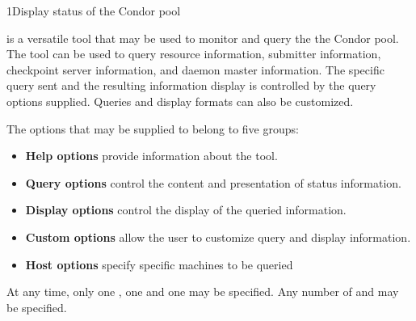\begin{ManPage}{}{1}{Display status of the Condor pool}
\label{man-condor-status}
\Synopsis {}

\Description
{} is a versatile tool that may be used to monitor and query the 
the Condor pool.  The  tool can be used to query resource 
information, submitter information, checkpoint server information, and daemon
master information.  The specific query sent and the resulting information 
display is controlled by the query options supplied.  Queries and display 
formats can also be customized.

The options that may be supplied to  belong to five groups:
\begin{itemize}
	\item \textbf{Help options} provide information about the 
		tool.
	\item \textbf{Query options} control the content and presentation of status
		information.
	\item \textbf{Display options} control the display of the queried 
		information.
	\item \textbf{Custom options} allow the user to customize query and
		display information.
	\item \textbf{Host options} specify specific machines to be queried
\end{itemize}

At any time, only one , one  and one
 may be specified.  Any number of  and  may be specified.


\end{ManPage}
